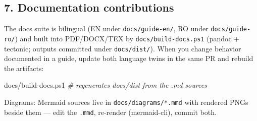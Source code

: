 \documentclass[
]{article}
\newenvironment{Shaded}{}{}
\newcommand{\CommentTok}[1]{\textcolor[rgb]{0.38,0.63,0.69}{\textit{#1}}}
\newcommand{\FunctionTok}[1]{\textcolor[rgb]{0.02,0.16,0.49}{#1}}
\newcommand{\NormalTok}[1]{#1}
\newcommand{\OperatorTok}[1]{\textcolor[rgb]{0.40,0.40,0.40}{#1}}
\begin{document}
\subsection{7. Documentation
contributions}\label{7-documentation-contributions}

The docs suite is bilingual (EN under \texttt{docs/guide-en/}, RO under
\texttt{docs/guide-ro/}) and built into PDF/DOCX/TEX by
\texttt{docs/build-docs.ps1} (pandoc + tectonic; outputs committed under
\texttt{docs/dist/}). When you change behavior documented in a guide,
update both language twins in the same PR and rebuild the artifacts:

\begin{Shaded}
\begin{Highlighting}[]
\NormalTok{docs}\OperatorTok{/}\NormalTok{build{-}docs}\OperatorTok{.}\FunctionTok{ps1}    \CommentTok{\# regenerates docs/dist from the .md sources}
\end{Highlighting}
\end{Shaded}

Diagrams: Mermaid sources live in \texttt{docs/diagrams/*.mmd} with
rendered PNGs beside them --- edit the \texttt{.mmd}, re-render
(mermaid-cli), commit both.
\end{document}

